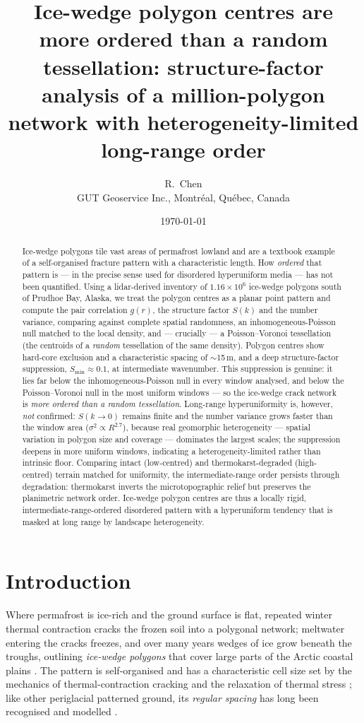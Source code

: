 \documentclass[11pt]{article}
\title{\bfseries Ice-wedge polygon centres are more ordered than a random
tessellation: structure-factor analysis of a million-polygon network with
heterogeneity-limited long-range order}
\author{R.~Chen\\{\small GUT Geoservice Inc., Montr\'eal, Qu\'ebec, Canada}}
\date{\today}
\begin{document}
\maketitle

\begin{abstract}
\noindent
Ice-wedge polygons tile vast areas of permafrost lowland and are a textbook example
of a self-organised fracture pattern with a characteristic length. How \emph{ordered}
that pattern is --- in the precise sense used for disordered hyperuniform media --- has
not been quantified. Using a lidar-derived inventory of $1.16\times10^{6}$ ice-wedge
polygons south of Prudhoe Bay, Alaska, we treat the polygon centres as a planar point
pattern and compute the pair correlation $g(r)$, the structure factor $S(k)$ and the
number variance, comparing against complete spatial randomness, an inhomogeneous-Poisson
null matched to the local density, and --- crucially --- a Poisson--Voronoi tessellation
(the centroids of a \emph{random} tessellation of the same density). Polygon centres show
hard-core exclusion and a characteristic spacing of $\sim$15\,m, and a deep
structure-factor suppression, $S_{\min}\!\approx\!0.1$, at intermediate wavenumber. This
suppression is genuine: it lies far below the inhomogeneous-Poisson null in every window
analysed, and below the Poisson--Voronoi null in the most uniform windows --- so the
ice-wedge crack network is \emph{more ordered than a random tessellation}. Long-range
hyperuniformity is, however, \emph{not} confirmed: $S(k\!\to\!0)$ remains finite and the
number variance grows faster than the window area ($\sigma^2\!\propto\!R^{2.7}$), because
real geomorphic heterogeneity --- spatial variation in polygon size and coverage ---
dominates the largest scales; the suppression deepens in more uniform windows, indicating
a heterogeneity-limited rather than intrinsic floor. Comparing intact (low-centred) and
thermokarst-degraded (high-centred) terrain matched for uniformity, the intermediate-range
order persists through degradation: thermokarst inverts the microtopographic relief but
preserves the planimetric network order. Ice-wedge polygon centres are thus a locally
rigid, intermediate-range-ordered disordered pattern with a hyperuniform tendency that is
masked at long range by landscape heterogeneity.
\end{abstract}

\section{Introduction}
Where permafrost is ice-rich and the ground surface is flat, repeated winter thermal
contraction cracks the frozen soil into a polygonal network; meltwater entering the cracks
freezes, and over many years wedges of ice grow beneath the troughs, outlining
\emph{ice-wedge polygons} that cover large parts of the Arctic coastal plains
\citep{lachenbruch1962}. The pattern is self-organised and has a characteristic cell size
set by the mechanics of thermal-contraction cracking and the relaxation of thermal stress
\citep{lachenbruch1962,plugwerner2002}; like other periglacial patterned ground, its
\emph{regular spacing} has long been recognised and modelled
\citep{kesslerwerner2003,plugwerner2002}.
\end{document}
